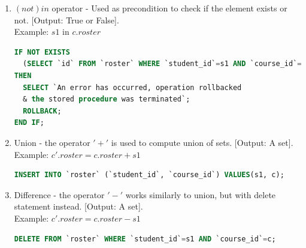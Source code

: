 \documentclass[oneside]{book}
\begin{document}
\begin{enumerate}
\item $(not) in$ operator - Used as precondition to check if the element exists or not. [Output: True or False]. \\
Example: $s1$ in $c.roster$

\begin{lstlisting}[escapechar=@,language=SQL]
IF NOT EXISTS 
  (SELECT `id` FROM `roster` WHERE `student_id`=s1 AND `course_id`=c) 
THEN
  SELECT `An error has occurred, operation rollbacked 
  & the stored procedure was terminated`;
  ROLLBACK;
END IF;
\end{lstlisting}

\item Union - the operator $'+'$ is used to compute union of sets. [Output: A set].\\
Example: $c'.roster = c.roster + s1$

\begin{lstlisting}[escapechar=@,language=SQL]
INSERT INTO `roster` (`student_id`, `course_id`) VALUES(s1, c);
\end{lstlisting}

\item Difference - the operator $'-'$ works similarly to union, but with delete statement instead. [Output: A set].\\
Example: $c'.roster = c.roster - s1$

\begin{lstlisting}[escapechar=@,language=SQL]
DELETE FROM `roster` WHERE `student_id`=s1 AND `course_id`=c;
\end{lstlisting}


\end{enumerate}
\end{document}
